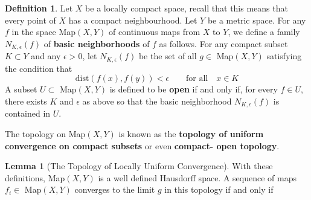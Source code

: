 \documentclass{article}
\theoremstyle{definition}
\newtheorem*{defn}{Definition}
\newtheorem{lemma}{Lemma}
\begin{document}
    \begin{defn}
        Let $X$ be a locally compact space, recall that this means that every point of $X$ has a compact neighbourhood. Let $Y$ be a
        metric space. For any $f$ in the space Map$(X,Y)$ of continuous maps from $X$ to $Y$, we define a family $N_{K,\epsilon}(f)$
        of \textbf{basic neighborhoods} of $f$ as follows. For any compact subset $K\subset Y$ and any $\epsilon>0$, let
        $N_{K,\epsilon}(f)$ be the set of all $g\in$ Map$(X,Y)$ satisfying the condition that
        \[ \text{dist}(f(x),f(y)) < \epsilon\qquad\text{for all}\quad x\in K \]
        A subset $U\subset$ Map$(X,Y)$ is defined to be \textbf{open} if and only if, for every $f\in U$, there exists $K$ and
        $\epsilon$ as above so that the basic neighborhood $N_{K,\epsilon}(f)$ is contained in $U$.
    \end{defn}

    The topology on Map$(X,Y)$ is known as the \textbf{topology of uniform convergence on compact subsets} or even \textbf{compact-
        open topology}.

    \begin{lemma}[The Topology of Locally Uniform Convergence]
        With these definitions, Map$(X,Y)$ is a well defined Hausdorff space. A sequence of maps $f_i\in$ Map$(X,Y)$ converges to
        the limit $g$ in this topology if and only if
    \end{lemma}
\end{document}
